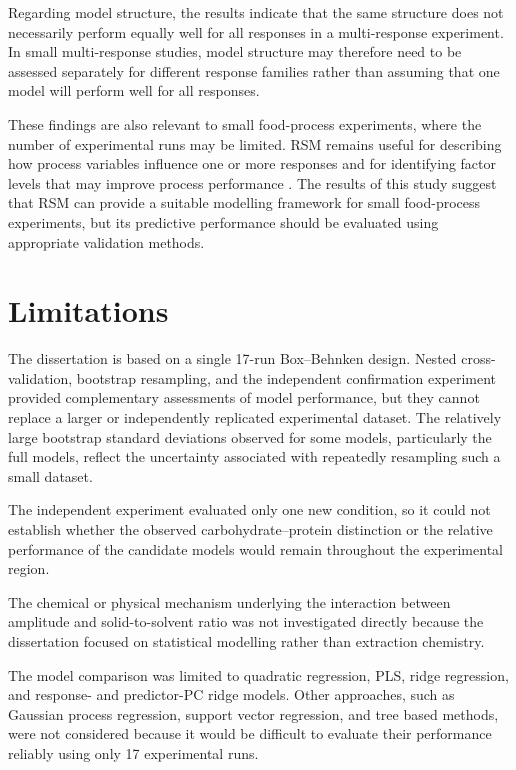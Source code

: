 \documentclass[MScDSA]{uccthesis}
\begin{document}
Regarding model structure, the results indicate that the same structure does not necessarily perform equally well for all responses in a multi-response experiment. In small multi-response studies, model structure may therefore need to be assessed separately for different response families rather than assuming that one model will perform well for all responses.

These findings are also relevant to small food-process experiments, where the number of experimental runs may be limited. RSM remains useful for describing how process variables influence one or more responses and for identifying factor levels that may improve process performance \parencite{Bezerra:2008}. The results of this study suggest that RSM can provide a suitable modelling framework for small food-process experiments, but its predictive performance should be evaluated using appropriate validation methods.


\section{Limitations}
The dissertation is based on a single 17-run Box--Behnken design. Nested cross-validation, bootstrap resampling, and the independent confirmation experiment provided complementary assessments of model performance, but they cannot replace a larger or independently replicated experimental dataset. The relatively large bootstrap standard deviations observed for some models, particularly the full models, reflect the uncertainty associated with repeatedly resampling such a small dataset.

The independent experiment evaluated only one new condition, so it could not establish whether the observed carbohydrate--protein distinction or the relative performance of the candidate models would remain throughout the experimental region.

The chemical or physical mechanism underlying the interaction between amplitude and solid-to-solvent ratio was not investigated directly because the dissertation focused on statistical modelling rather than extraction chemistry. 

The model comparison was limited to quadratic regression, PLS, ridge regression, and response- and predictor-PC ridge models. Other approaches, such as Gaussian process regression, support vector regression, and tree based methods, were not considered because it would be difficult to evaluate their performance reliably using only 17 experimental runs.
\end{document}
